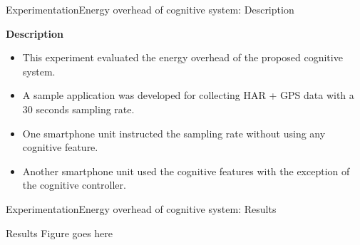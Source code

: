 \begin{frame}{Experimentation}{Energy overhead of cognitive system: Description}
\small
\begin{block}{\small \textbf{Description}}
\begin{itemize}
  \item This experiment evaluated the energy overhead of the proposed cognitive system.
  \item A sample application was developed for collecting HAR + GPS data with a 30 seconds sampling rate.
  \item One smartphone unit instructed the sampling rate without using any cognitive feature.
  \item Another smartphone unit used the cognitive features with the exception of the cognitive controller.
\end{itemize}
\end{block}


\begin{table}
\centering
\renewcommand{\arraystretch}{0.8}
\caption{Input parameters for the energy overhead measurement experiment (Geofencing and Stay Points Detector enabled only in one smartphone).}
\label{tab:exp-7-input-parameters}
\end{table}
\end{frame}

\begin{frame}{Experimentation}{Energy overhead of cognitive system: Results}
\small
\begin{block}{Results}
Figure goes here
\end{block}
\end{frame}

